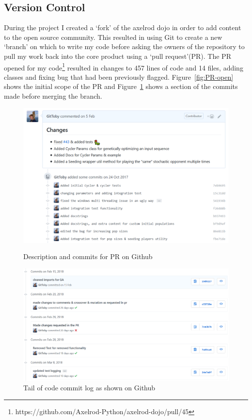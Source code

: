\subsection{Version Control}\label{ssec:versioncontrol}
During the project I created a `fork' of the axelrod dojo in order to add content to the open source community. 
This resulted in using Git to create a new `branch' on which to write my code before asking the owners of the repository to pull my work back into the core product using a `pull request'(PR).
The PR opened for my code\footnote{https://github.com/Axelrod-Python/axelrod-dojo/pull/45} resulted in changes to 457 lines of code and 14 files, adding classes and fixing bug that had been previously flagged.
Figure~\ref{fig:PR-open} shows the initial scope of the PR and Figure~\ref{fig:commit-log} shows a section of the commits made before merging the branch.

\begin{figure}[ht]
    \centering
    \begin{minipage}{0.48\textwidth}
        \centering
        \includegraphics[width=1.0\textwidth, center]{./img/vcs/PR-Open.png}
        \caption{Description and commits for PR on Github}\label{fig:PR-open}
    \end{minipage}\hfill
    \begin{minipage}{0.48\textwidth}
        \centering
        \includegraphics[width=1.0\textwidth, center,keepaspectratio]{./img/vcs/commit-log.png}    
        \caption{Tail of code commit log as shown on Github}\label{fig:commit-log}
    \end{minipage}
\end{figure}

